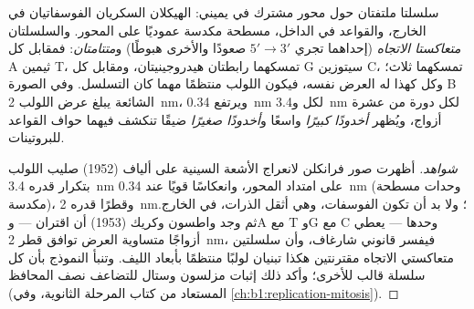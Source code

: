 \begin{theorem}\label{thm:b1:nucleic-acids:helix}
 سلسلتا  ملتفتان حول محور مشترك في \emph{} يميني: الهيكلان السكريان الفوسفاتيان في الخارج، والقواعد في
الداخل، مسطحة مكدسة عموديًا على المحور. والسلسلتان
\emph{متعاكستا الاتجاه} (إحداهما تجري $5' \to 3'$ صعودًا والأخرى
هبوطًا) و\emph{متتامتان}: فمقابل كل A ثيمين T، تمسكهما رابطتان
هيدروجينيتان، ومقابل كل G سيتوزين C، تمسكهما ثلاث؛ وكل \emph{} كهذا له العرض نفسه، فيكون اللولب منتظمًا مهما كان التسلسل. وفي
الصورة B الشائعة يبلغ عرض اللولب \qty{2}{nm}، ويرتفع \qty{0.34}{nm}
لكل  و\qty{3.4}{nm} لكل دورة من عشرة أزواج، ويُظهر
\emph{أخدودًا كبيرًا} واسعًا و\emph{أخدودًا صغيرًا} ضيقًا تنكشف فيهما
حواف القواعد للبروتينات.
\end{theorem}
\begin{proof}[شواهد]
أظهرت صور فرانكلن لانعراج الأشعة السينية على ألياف  (1952) صليب
اللولب بتكرار قدره \qty{3.4}{nm} على امتداد المحور، وانعكاسًا قويًا
عند \qty{0.34}{nm} (وحدات مسطحة مكدسة)، وقطرًا قدره \qty{2}{nm}؛ ولا
بد أن تكون الفوسفات، وهي أثقل الذرات، في الخارج. ثم وجد واطسون وكريك
(1953) أن اقتران   --- وA مع T وG مع C وحدها ---
يعطي أزواجًا متساوية العرض توافق قطر \qty{2}{nm}، فيفسر قانوني
شارغاف، وأن سلسلتين متعاكستي الاتجاه مقترنتين هكذا تبنيان لولبًا
منتظمًا بأبعاد الليف. وتنبأ النموذج بأن كل سلسلة قالب للأخرى؛ وأكد
ذلك إثبات مزلسون وستال للتضاعف نصف المحافظ (المستعاد من كتاب المرحلة
الثانوية، وفي \cref{ch:b1:replication-mitosis}).
\end{proof}

